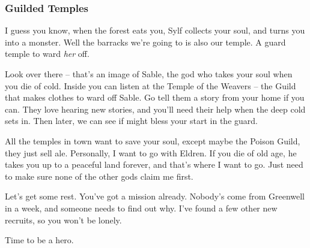 \begin{multicols}{2}
\begin{exampletext}
  \subsubsection*{Guilded Temples}

  I guess you know, when the forest eats you, Sylf collects your soul, and turns you into a monster.
  Well the barracks we're going to is also our temple.
  A \gls{guard} temple to ward \emph{her} off.

  Look over there -- that's an image of Sable, the god who takes your soul when you die of cold.
  Inside you can listen at the Temple of the Weavers -- the Guild that makes clothes to ward off Sable.
  Go tell them a story from your home if you can.
  They love hearing new stories, and you'll need their help when the deep cold sets in.
  Then later, we can see if  might bless your start in the \gls{guard}.

  All the temples in town want to save your soul, except maybe the Poison Guild, they just sell ale.
  Personally, I want to go with Eldren.
  If you die of old age, he takes you up to a peaceful land forever, and that's where I want to go.
  Just need to make sure none of the other gods claim me first.

  Let's get some rest.
  You've got a mission already.
  Nobody's come from Greenwell in a week, and someone needs to find out why.
  I've found a few other new recruits, so you won't be lonely.

  Time to be a hero.

\end{exampletext}

\end{multicols}
